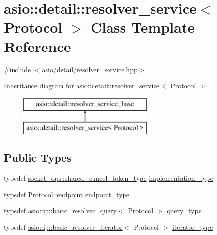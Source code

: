 \hypertarget{classasio_1_1detail_1_1resolver__service}{}\section{asio\+:\+:detail\+:\+:resolver\+\_\+service$<$ Protocol $>$ Class Template Reference}
\label{classasio_1_1detail_1_1resolver__service}


{\ttfamily \#include $<$asio/detail/resolver\+\_\+service.\+hpp$>$}

Inheritance diagram for asio\+:\+:detail\+:\+:resolver\+\_\+service$<$ Protocol $>$\+:\begin{figure}[H]
\begin{center}
\leavevmode
\includegraphics[height=2.000000cm]{classasio_1_1detail_1_1resolver__service}
\end{center}
\end{figure}
\subsection*{Public Types}
\begin{DoxyCompactItemize}
\item 
typedef \hyperlink{namespaceasio_1_1detail_1_1socket__ops_a6f7dec33c65c050a3ee96d6b17dafc9c}{socket\+\_\+ops\+::shared\+\_\+cancel\+\_\+token\+\_\+type} \hyperlink{classasio_1_1detail_1_1resolver__service_a9b39aff4ee39b0f45731ec01d9f5fd74}{implementation\+\_\+type}
\item 
typedef Protocol\+::endpoint \hyperlink{classasio_1_1detail_1_1resolver__service_a4c9bdef1b2990355b5e02df3056554df}{endpoint\+\_\+type}
\item 
typedef \hyperlink{classasio_1_1ip_1_1basic__resolver__query}{asio\+::ip\+::basic\+\_\+resolver\+\_\+query}$<$ Protocol $>$ \hyperlink{classasio_1_1detail_1_1resolver__service_a3200fbe0279811d68ebacc1bd28d4418}{query\+\_\+type}
\item 
typedef \hyperlink{classasio_1_1ip_1_1basic__resolver__iterator}{asio\+::ip\+::basic\+\_\+resolver\+\_\+iterator}$<$ Protocol $>$ \hyperlink{classasio_1_1detail_1_1resolver__service_ab9c188c775855b13d06f6682014cbf55}{iterator\+\_\+type}
\end{DoxyCompactItemize}
